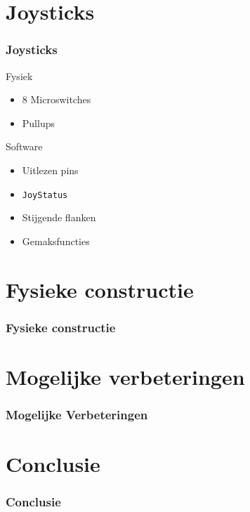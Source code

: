 \documentclass{beamer}
\begin{document}
\section{Joysticks}
\begin{frame}
  \frametitle{Joysticks}

  \begin{block}{Fysiek}
    \begin{itemize}
    \item 8 Microswitches
    \item Pullups
    \end{itemize}
  \end{block}

  \begin{block}{Software}
    \begin{itemize}
    \item Uitlezen pins
    \item \texttt{JoyStatus}
    \item Stijgende flanken
    \item Gemaksfuncties
    \end{itemize}
  \end{block}
\end{frame}

\section{Fysieke constructie}
\begin{frame}
  \frametitle{Fysieke constructie}
\end{frame}

\section{Mogelijke verbeteringen}
\begin{frame}
  \frametitle{Mogelijke Verbeteringen}
  
\end{frame}

\section{Conclusie}
\begin{frame}
  \frametitle{Conclusie}
  
\end{frame}
\end{document}
